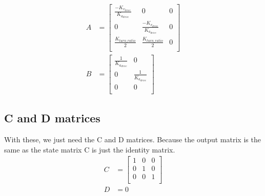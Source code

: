 \documentclass{scrartcl}
\begin{document}
\begin{align}
    A & =
    \begin{bmatrix}
        \frac{-K_{v_\mathit{drive}}}{K_{a_\mathit{drive}}} & 0                                                  & 0 \\
        0                                                  & \frac{-K_{v_\mathit{drive}}}{K_{a_\mathit{drive}}} & 0 \\
        \frac{K_\mathit{turn\_ratio}}{2}                   & \frac{K_\mathit{turn\_ratio}}{2}                   & 0 \\
    \end{bmatrix} \\
    B & =
    \begin{bmatrix}
        \frac{1}{K_{a_\mathit{drive}}} & 0                              \\
        0                              & \frac{1}{K_{a_\mathit{drive}}} \\
        0                              & 0                              \\
    \end{bmatrix}
\end{align}

\subsection{C and D matrices}
With these, we just need the C and D matrices.
Because the output matrix is the same as the state matrix C is just the identity matrix.
\begin{align}
    C & =
    \begin{bmatrix}
        1 & 0 & 0 \\
        0 & 1 & 0 \\
        0 & 0 & 1 \\
    \end{bmatrix} \\
    D & = 0
\end{align}
\end{document}
